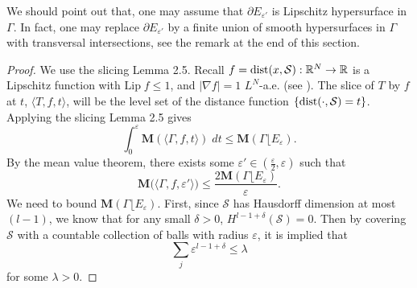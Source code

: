 \documentclass{amsart}
\numberwithin{equation}{section}
\theoremstyle{definition}
\theoremstyle{remark}
\begin{document}
 We should point out that, one may assume that $\partial E_{\varepsilon'}$ is Lipschitz hypersurface in $\Gamma$. In fact, one may replace 
 $\partial E_{\varepsilon'}$ by a finite union of smooth hypersurfaces in $\Gamma$ with transversal intersections, see 
 the remark at the end of this section.

\begin{proof} We use the slicing Lemma 2.5.
Recall $f = {\rm{dist}}(x,\mathcal{S}):\mathbb{R}^N \to \mathbb{R}$ is a Lipschitz function with $\text{Lip} \; f \leq 1$, and $|\nabla f| =1$ $ L ^N$-a.e. (see \cite[Theorem 3.14]{Evans}). The slice of $T$ by $f$ at $t$,
$\langle T, f, t\rangle$, will be the level set of the distance function $\{{\rm{dist}}(\cdot,\mathcal{S})=t\}$. Applying the slicing Lemma 2.5 
gives
\[ \int_0^\varepsilon \mathbf{M}(\langle \Gamma,f,t \rangle ) \; dt \leq  \mathbf{M}(\Gamma\lfloor E_{\varepsilon}). \]
By the mean value theorem, there exists some $\varepsilon' \in (\frac{\varepsilon}2,\varepsilon)$ such that
\[ \mathbf{M}\big(\langle \Gamma, f, \varepsilon' \rangle \big) \leq \frac{2\mathbf{M}(\Gamma\lfloor E_{\varepsilon})}{\varepsilon} .\]
We need to bound $\mathbf{M}(\Gamma\lfloor E_\varepsilon)$.
First, since $\mathcal{S}$ has  Hausdorff dimension  at most
 $(l-1)$, we know that for any small $\delta>0$, $H^{l-1+\delta}(\mathcal{S})=0$. Then by covering $\mathcal{S}$ 
 with a countable collection of balls with radius $\varepsilon$, it is implied that
\[ \sum_j \varepsilon^{l-1+\delta} \le \lambda \]
for some $\lambda>0$.


\end{proof}
\end{document}
